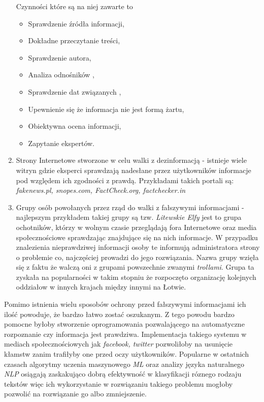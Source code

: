 \begin{enumerate}
    Czynności które są na niej zawarte to 
    \begin{itemize}
        \item Sprawdzenie źródła informacji,
        \item Dokładne przeczytanie treści,
        \item Sprawdzenie autora,
        \item Analiza odnośników ,
        \item Sprawdzenie dat związanych ,
        \item Upewnienie się że informacja nie jest formą żartu,
        \item Obiektywna ocena informacji,
        \item Zapytanie ekspertów.
    \end{itemize}
    \item Strony Internetowe stworzone w celu walki z dezinformacją - istnieje
    wiele witryn gdzie eksperci sprawdzają nadesłane przez użytkowników informacje
    pod względem ich zgodności z prawdą.
    Przykładami takich portali są: \emph{fakenews.pl, snopes.com, FactCheck.org, factchecker.in} 
    \item Grupy osób powołanych przez rząd do walki z fałszywymi informacjami - najlepszym przykładem
    takiej grupy są tzw. \emph{Litewskie Elfy} jest to grupa ochotników, którzy w wolnym czasie przeglądają 
    fora Internetowe oraz media społecznościowe sprawdzając znajdujące się na nich informacje. W przypadku
    znalezienia nieprawdziwej informacji osoby te informują administratora strony o problemie co, najczęściej
    prowadzi do jego rozwiązania. Nazwa grupy wzięła się z faktu że walczą oni z 
    grupami powszechnie zwanymi \emph{trollami}. Grupa ta zyskała na popularności
    w takim stopniu że rozpoczęto organizację kolejnych oddziałow w innych krajach
    między innymi na Łotwie.~\cite{Elves}
\end{enumerate}
Pomimo istnienia wielu sposobów ochrony przed fałszywymi informacjami ich ilość powoduje,
że bardzo łatwo zostać oszukanym. Z tego powodu bardzo pomocne byłoby stworzenie oprogramowania
pozwalającego na automatyczne rozpoznanie czy informacja jest prawdziwa.
Implementacja takiego systemu w mediach społecznościowych jak \emph{facebook, twitter} pozwoliłoby na usunięcie 
kłamstw zanim trafiłyby one przed oczy użytkowników. Popularne w ostatnich czasach algorytmy uczenia
maszynowego \emph{ML} oraz analizy języka naturalnego \emph{NLP} osiągają zaskakująco dobrą 
efektywność w klasyfikacji róznego rodzaju tekstów więc ich wykorzystanie w rozwiązaniu takiego 
problemu mogłoby pozwolić na rozwiązanie go albo zmniejszenie.

